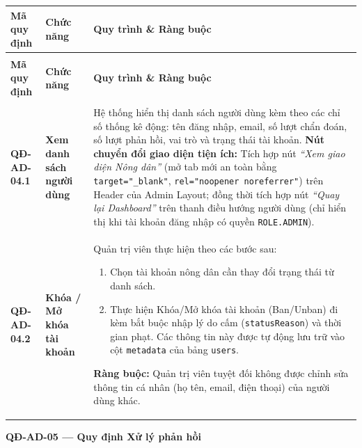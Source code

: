\documentclass[12pt,a4paper]{article}
\begin{document}
\begin{longtable}{|
        >{\raggedright\arraybackslash}p{2.2cm}|
        >{\raggedright\arraybackslash}p{2.8cm}|
        >{\raggedright\arraybackslash}p{9.8cm}|}
    \hline
    \rowcolor{headerblue}
    \textbf{Mã quy định} & \textbf{Chức năng} & \textbf{Quy trình \& Ràng buộc} \\
    \hline
    \endfirsthead
    \multicolumn{3}{c}{{\tablename\ -- Tiếp theo trang trước}} \\
    \hline
    \rowcolor{headerblue}
    \textbf{Mã quy định} & \textbf{Chức năng} & \textbf{Quy trình \& Ràng buộc} \\
    \hline
    \endhead
    \hline \multicolumn{3}{|r|}{{Tiếp tục ở trang sau...}} \\ \hline
    \endfoot
    \hline
    \endlastfoot
    \textbf{QĐ-AD-04.1} & \textbf{Xem danh sách người dùng} &
    Hệ thống hiển thị danh sách người dùng kèm theo các chỉ số thống kê động: tên đăng nhập, email, số lượt chẩn đoán, số lượt phản hồi, vai trò và trạng thái tài khoản. \newline
    \textbf{Nút chuyển đổi giao diện tiện ích:} Tích hợp nút \textit{``Xem giao diện Nông dân''} (mở tab mới an toàn bằng \texttt{target="\_blank"}, \texttt{rel="noopener noreferrer"}) trên Header của Admin Layout; đồng thời tích hợp nút \textit{``Quay lại Dashboard''} trên thanh điều hướng người dùng (chỉ hiển thị khi tài khoản đăng nhập có quyền \texttt{ROLE.ADMIN}). \\
    \hline
    \textbf{QĐ-AD-04.2} & \textbf{Khóa / Mở khóa tài khoản} &
    Quản trị viên thực hiện theo các bước sau:
    \begin{enumerate}[leftmargin=*,topsep=2pt,itemsep=1pt]
        \item Chọn tài khoản nông dân cần thay đổi trạng thái từ danh sách.
        \item Thực hiện Khóa/Mở khóa tài khoản (Ban/Unban) đi kèm bắt buộc nhập lý do cấm (\texttt{statusReason}) và thời gian phạt. Các thông tin này được tự động lưu trữ vào cột \texttt{metadata} của bảng \texttt{users}.
    \end{enumerate}
    \textbf{Ràng buộc:} Quản trị viên tuyệt đối không được chỉnh sửa thông tin cá nhân (họ tên, email, điện thoại) của người dùng khác. \\
    \hline
\end{longtable}

\vspace{0.3cm}
\noindent\textbf{QĐ-AD-05 --- Quy định Xử lý phản hồi}
\end{document}
